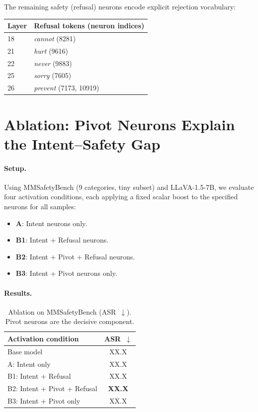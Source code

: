 \documentclass{article}
\begin{document}
The remaining safety (refusal) neurons encode explicit
rejection vocabulary:

\begin{center}\small
\begin{tabular}{ll}
  \toprule
  Layer & Refusal tokens (neuron indices) \\
  \midrule
  18 & \emph{cannot} (8281) \\
  21 & \emph{hurt} (9616) \\
  22 & \emph{never} (9883) \\
  25 & \emph{sorry} (7605) \\
  26 & \emph{prevent} (7173, 10919) \\
  \bottomrule
\end{tabular}
\end{center}

\section{Ablation: Pivot Neurons Explain the Intent--Safety Gap}
\label{sec:ablation}

\paragraph{Setup.}
Using MMSafetyBench (9 categories, tiny subset) and LLaVA-1.5-7B,
we evaluate four activation conditions, each applying a fixed
scalar boost to the specified neurons for all samples:
\begin{itemize}
  \item \textbf{A}: Intent neurons only.
  \item \textbf{B1}: Intent + Refusal neurons.
  \item \textbf{B2}: Intent + Pivot + Refusal neurons.
  \item \textbf{B3}: Intent + Pivot neurons only.
\end{itemize}

\paragraph{Results.}
\begin{table}[t]
  \caption{Ablation on MMSafetyBench (ASR~$\downarrow$).
  Pivot neurons are the decisive component.}
  \label{tab:ablation}
  \centering
  \small
  \begin{tabular}{lc}
    \toprule
    Activation condition & ASR~$\downarrow$ \\
    \midrule
    Base model           & XX.X \\
    A: Intent only       & XX.X \\
    B1: Intent + Refusal & XX.X \\
    B2: Intent + Pivot + Refusal & \textbf{XX.X} \\
    B3: Intent + Pivot only & XX.X \\
    \bottomrule
  \end{tabular}
\end{table}
\end{document}

